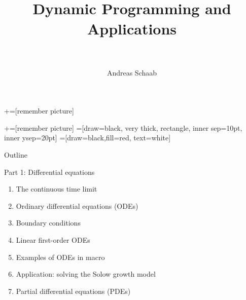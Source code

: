 \documentclass[11pt, aspectratio=169]{beamer}
\title[]{\\[8pt]
	{\large \color{blue} Dynamic Programming and Applications \\[5pt] \normalfont{Deterministic Dynamic Programming in Continuous Time} \\[10pt] \normalfont{Lectures 3 -- 4}}}
\author[Schaab]{Andreas Schaab}
\institute{}
\date{}
\begin{document}
+=[remember picture]

\newcommand\marktopleft[1]{%
	\tikz[overlay,remember picture] 
	\node (marker-#1-a) at (-.3em,.3em) {};%
}
\newcommand\markbottomright[2]{%
	\tikz[overlay,remember picture] 
	\node (marker-#1-b) at (0em,0em) {};%
}
+=[remember picture] 
 =[draw=black, very thick, rectangle, inner sep=10pt, inner ysep=20pt]
 =[draw=black,fill=red, text=white]


\addtocounter{framenumber}{-1}
\thispagestyle{empty}
\maketitle 
\newpage




\begin{frame}{Outline}
\thispagestyle{empty}
\addtocounter{framenumber}{-1}

Part 1: Differential equations
\begin{enumerate}
	\item The continuous time limit
	\item Ordinary differential equations (ODEs)
	\item Boundary conditions 
	\item Linear first-order ODEs
	\item Examples of ODEs in macro
	\item Application: solving the Solow growth model
	\item Partial differential equations (PDEs)
\end{enumerate}

\end{frame}
\end{document}

